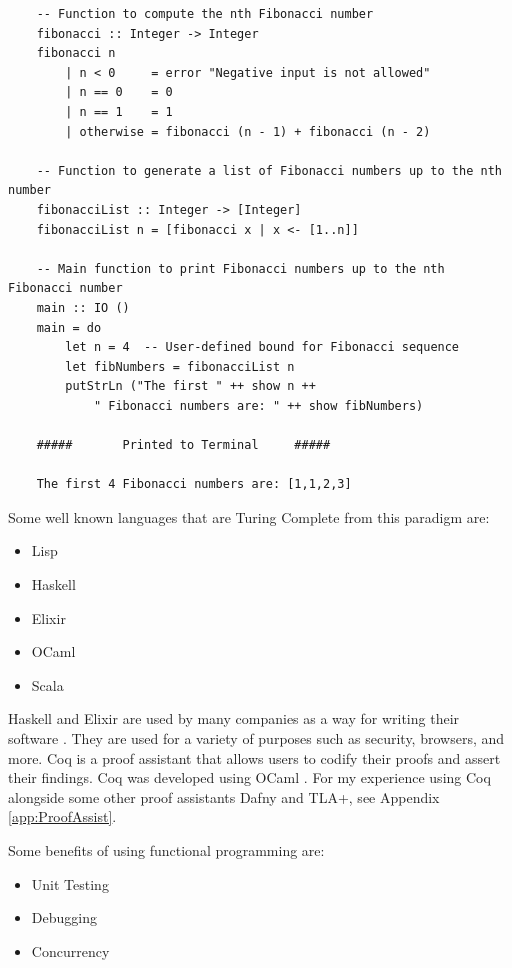 \begin{verbatim}
    -- Function to compute the nth Fibonacci number
    fibonacci :: Integer -> Integer
    fibonacci n
        | n < 0     = error "Negative input is not allowed"
        | n == 0    = 0
        | n == 1    = 1
        | otherwise = fibonacci (n - 1) + fibonacci (n - 2)

    -- Function to generate a list of Fibonacci numbers up to the nth number
    fibonacciList :: Integer -> [Integer]
    fibonacciList n = [fibonacci x | x <- [1..n]]

    -- Main function to print Fibonacci numbers up to the nth Fibonacci number
    main :: IO ()
    main = do
        let n = 4  -- User-defined bound for Fibonacci sequence
        let fibNumbers = fibonacciList n
        putStrLn ("The first " ++ show n ++  
            " Fibonacci numbers are: " ++ show fibNumbers)

    #####       Printed to Terminal     #####

    The first 4 Fibonacci numbers are: [1,1,2,3]
\end{verbatim}

Some well known languages that are Turing Complete from this paradigm are:  
\begin{itemize}
    \item Lisp
    \item Haskell
    \item Elixir
    \item OCaml
    \item Scala
\end{itemize}

Haskell and Elixir are used by many companies as a way for writing their software \cite{HaskellList,HaskellListReadme,ElixirList,ElixirListReadme}.
They are used for a variety of purposes such as security, browsers, and more.
Coq is a proof assistant that allows users to codify their proofs and assert their findings.
Coq was developed using OCaml \cite{OCamlCoq}.
For my experience using Coq alongside some other proof assistants Dafny and TLA+, see Appendix \ref{app:ProofAssist}.

\newpage
Some benefits of using functional programming are:
\begin{itemize}
    \item Unit Testing
    \item Debugging
    \item Concurrency
\end{itemize}

